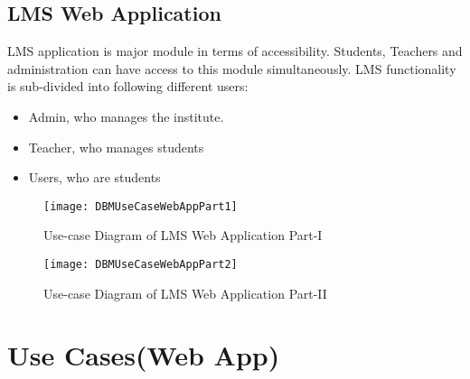 \newpage
\subsection{LMS Web Application}
LMS application is major module in terms of accessibility. Students, Teachers and administration can have access to this module simultaneously. LMS functionality is sub-divided into following different users:

\begin{itemize}

\item Admin, who manages the institute.
\item Teacher, who manages students
\item Users, who are students


\end{itemize}

\bigskip

\begin{figure}[h]
  \centering
  \texttt{[image: DBMUseCaseWebAppPart1]}
  \caption{Use-case Diagram of LMS Web Application Part-I}
\end{figure}

\begin{figure}[h]
  \centering
  \texttt{[image: DBMUseCaseWebAppPart2]}
  \caption{Use-case Diagram of LMS Web Application Part-II}
\end{figure}

\bigskip
\bigskip

\section{Use Cases(Web App)}
